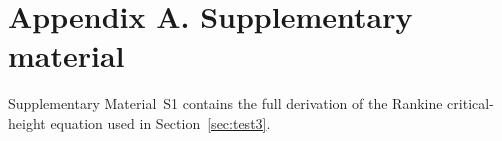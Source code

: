 \documentclass[preprint,review,12pt,authoryear]{elsarticle}
\begin{document}
\section*{Appendix A. Supplementary material}

Supplementary Material~S1 contains the full derivation of the Rankine critical-height equation used in Section~\ref{sec:test3}.



\end{document}
